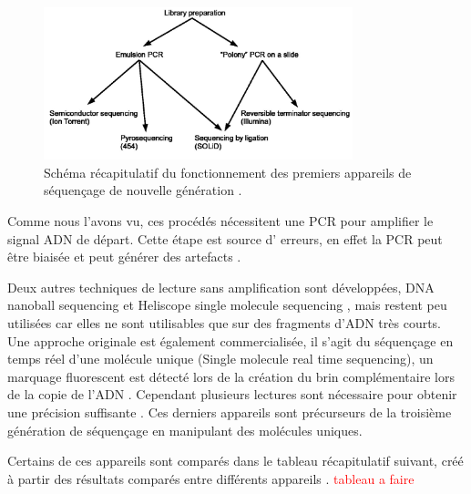 \begin{figure}[H]
\begin{center}
\includegraphics[width=0.8\textwidth]{ngsprinciple.jpg}
\vspace{0.5cm}

\caption[Principe du "next gen sequencing"]{Schéma récapitulatif du fonctionnement des premiers appareils de séquençage de nouvelle génération \cite{ngsprinciplejpg}.}
\label{ngsprinciple}
\end{center}
\end{figure}

Comme nous l'avons vu, ces procédés nécessitent une PCR pour amplifier le signal ADN de départ. Cette étape est source d' erreurs, en effet la PCR peut être biaisée et peut générer des artefacts \cite{Acinas2005}.



Deux autres techniques de lecture sans amplification sont développées, DNA nanoball sequencing \cite{Porreca2010} et Heliscope single molecule sequencing \cite{pmid20890904}, mais restent peu utilisées car elles ne sont utilisables que sur des fragments d'ADN très courts. Une approche originale est également commercialisée, il s'agit du séquençage en temps réel d'une molécule unique (Single molecule real time sequencing), un marquage fluorescent est détecté lors de la création du brin complémentaire lors de la copie de l'ADN \cite{Eid2009}. Cependant plusieurs lectures sont nécessaire pour obtenir une précision suffisante \cite{Chin2013}. Ces derniers appareils sont précurseurs de la troisième génération de séquençage en manipulant des molécules uniques.



Certains de ces appareils sont comparés dans le tableau récapitulatif suivant, créé à partir des résultats comparés entre différents appareils \cite{Quail2012,Liu2012}. \textcolor{red}{tableau a faire}

